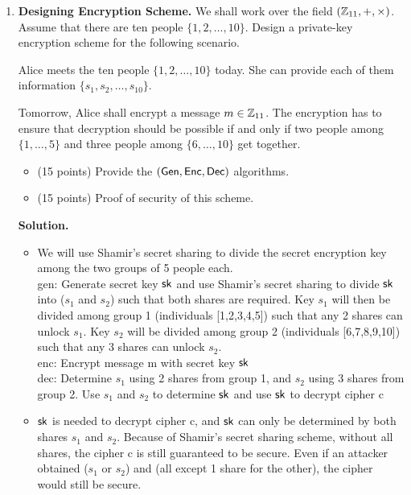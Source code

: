 \documentclass[11pt]{article}
\newcommand{\nextoddpage}{\checkoddpage\ifoddpage{\ \newpage\ \newpage}\else{\ \newpage}\fi}
\begin{document}
\begin{enumerate}
  (\footnotesize{\em Remark:} 
    To prove that the scheme is secure, provide a proof that the a priori distribution of messages is same as the a posteriori distribution. 
    To prove that the scheme is insecure, provide a proof that the a priori distribution of messages is different from the a posteriori distribution.)
  
  {\bfseries Solution.} 
  \begin{itemize} 
  \item Asdf
  \end{itemize}
    
    
    
\nextoddpage 
\item {\bfseries Designing Encryption Scheme.} 
  We shall work over the field $({\mathbb Z}_{11},+,\times)$. 
  Assume that there are ten people $\{1,2,\dotsc,10\}$. 
  Design a private-key encryption scheme for the following scenario. 
  
  Alice meets the ten people $\{1,2,\dotsc,10\}$ today. 
  She can provide each of them information $\{s_1,s_2,\dotsc,s_{10}\}$. 
  
  Tomorrow, Alice shall encrypt a message $m\in{\mathbb Z}_{11}$. 
  The encryption has to ensure that decryption should be possible if and only if two people among $\{1,\dotsc,5\}$ and three people among $\{6,\dotsc,10\}$ get together.
  
  
  \begin{itemize}
  \item (15 points) Provide the $(\mathsf{Gen},\mathsf{Enc},\mathsf{Dec})$ algorithms. 
  \item (15 points) Proof of security of this scheme. 
  \end{itemize}
  
  {\bfseries Solution.} 
  \begin{itemize} 
  \item We will use Shamir's secret sharing to divide the secret encryption key among the two groups of 5 people each. \\
  gen: Generate secret key $\mathsf{sk}$ and use Shamir's secret sharing to divide $\mathsf{sk}$ into ($s_1$ and $s_2$) such that both shares are required. Key $s_1$ will then be divided among group 1 (individuals [1,2,3,4,5]) such that any 2 shares can unlock $s_1$. Key $s_2$ will be divided among group 2 (individuals [6,7,8,9,10]) such that any 3 shares can unlock $s_2$. \\
  enc: Encrypt message m with secret key $\mathsf{sk}$ \\
  dec: Determine $s_1$ using 2 shares from group 1, and $s_2$ using 3 shares from group 2. Use $s_1$ and $s_2$ to determine $\mathsf{sk}$ and use $\mathsf{sk}$ to decrypt cipher c
  \item $\mathsf{sk}$ is needed to decrypt cipher c, and $\mathsf{sk}$ can only be determined by both shares $s_1$ and $s_2$. Because of Shamir's secret sharing scheme, without all shares, the cipher c is still guaranteed to be secure. Even if an attacker obtained ($s_1$ or $s_2$) and (all except 1 share for the other), the cipher would still be secure.
  \end{itemize}
 







\end{enumerate}
\end{document}
